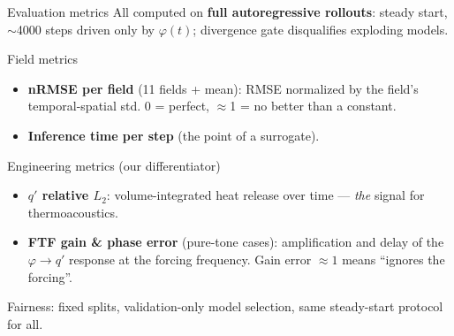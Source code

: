 \documentclass[10pt]{beamer}
\begin{document}
\begin{frame}{Evaluation metrics}
  All computed on \textbf{full autoregressive rollouts}: steady start, $\sim$4000 steps driven
  only by $\varphi(t)$; divergence gate disqualifies exploding models.
  \begin{block}{Field metrics}
    \begin{itemize}
      \item \textbf{nRMSE per field} (11 fields + mean): RMSE normalized by the field's
            temporal-spatial std. 0 = perfect, $\approx$1 = no better than a constant.
      \item \textbf{Inference time per step} (the point of a surrogate).
    \end{itemize}
  \end{block}
  \begin{block}{Engineering metrics (our differentiator)}
    \begin{itemize}
      \item \textbf{$q'$ relative $L_2$}: volume-integrated heat release over time ---
            \emph{the} signal for thermoacoustics.
      \item \textbf{FTF gain \& phase error} (pure-tone cases): amplification and delay of the
            $\varphi \to q'$ response at the forcing frequency. Gain error $\approx 1$ means
            ``ignores the forcing''.
    \end{itemize}
  \end{block}
  Fairness: fixed splits, validation-only model selection, same steady-start protocol for all.
\end{frame}
\end{document}
